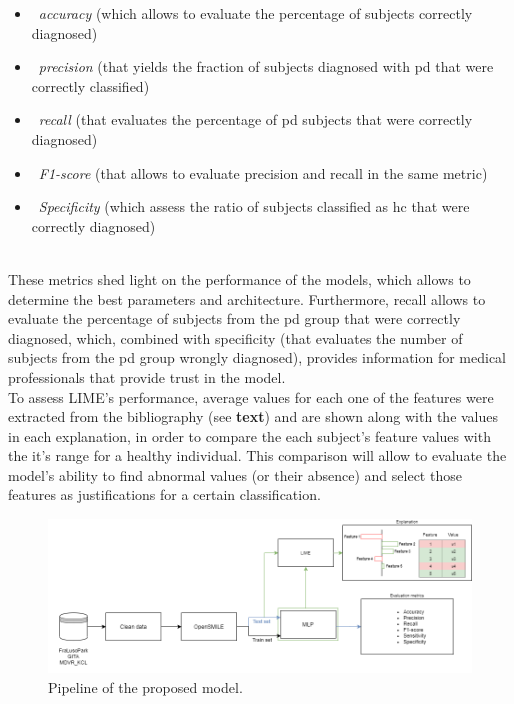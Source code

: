 \begin{itemize}
	\item ~\textit{accuracy} (which allows to evaluate the percentage of subjects correctly diagnosed)
	\item ~\textit{precision} (that yields the fraction of subjects diagnosed with \gls{pd} that were correctly classified)
	\item ~\textit{recall} (that evaluates the percentage of \gls{pd} subjects that were correctly diagnosed)
	\item ~\textit{F1-score} (that allows to evaluate precision and recall in the same metric)
	\item ~\textit{Specificity} (which assess the ratio of subjects classified as \gls{hc} that were correctly diagnosed)
\end{itemize}
\\
 	These metrics shed light on the performance of the models, which allows to determine the best parameters and architecture. Furthermore, recall allows to evaluate the percentage of subjects from the \gls{pd} group that were correctly diagnosed, which, combined with specificity (that evaluates the number of subjects from the \gls{pd} group wrongly diagnosed), provides information for medical professionals that provide trust in the model.
\\
To assess LIME's performance, average values for each one of the features were extracted from the bibliography (see \textbf{text}) and are shown along with the values in each explanation, in order to compare the each subject's feature values with the it's range for a healthy individual. This comparison will allow to evaluate the model's ability to find abnormal values (or their absence) and select those features as justifications for a certain classification.

\begin{figure}[t]
	\begin{center}
		\includegraphics[clip=true, width=\textwidth]{figs/pipeline.png}
	\end{center}
	\caption{Pipeline of the proposed model.}
	\label{pipeline}
\end{figure}

\pagebreak